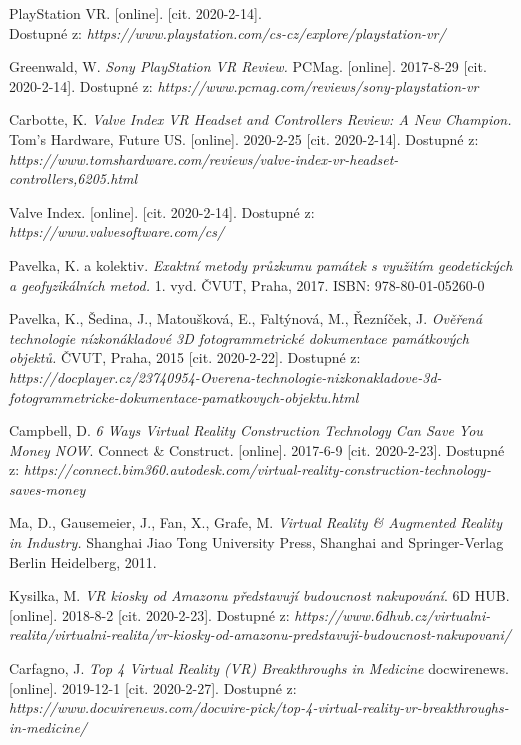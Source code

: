 \documentclass[a4paper, 12pt]{report}
\begin{document}
\begin{thebibliography}{9}
 PlayStation VR. [online]. [cit. 2020-2-14]. \\Dostupné z: \textit{https://www.playstation.com/cs-cz/explore/playstation-vr/}

 Greenwald, W. \textit{Sony PlayStation VR Review.} PCMag. [online]. 2017-8-29 [cit. 2020-2-14]. Dostupné z: \textit{https://www.pcmag.com/reviews/sony-playstation-vr}

  Carbotte, K. \textit{Valve Index VR Headset and Controllers Review: A New Champion.} Tom's Hardware, Future US. [online]. 2020-2-25 [cit. 2020-2-14]. Dostupné z: \textit{https://www.tomshardware.com/reviews/valve-index-vr-headset-controllers,6205.html}

 Valve Index. [online]. [cit. 2020-2-14]. Dostupné z: \textit{https://www.valvesoftware.com/cs/}

 Pavelka, K. a kolektiv. \textit{Exaktní metody průzkumu památek s využitím geodetických a geofyzikálních metod.} 1. vyd. ČVUT, Praha, 2017. ISBN: 978-80-01-05260-0

 Pavelka, K., Šedina, J., Matoušková, E., Faltýnová, M., Řezníček, J. \textit{Ověřená technologie nízkonákladové 3D fotogrammetrické dokumentace památkových objektů.} ČVUT, Praha, 2015 [cit. 2020-2-22]. Dostupné z: \textit{https://docplayer.cz/23740954-Overena-technologie-nizkonakladove-3d-fotogrammetricke-dokumentace-pamatkovych-objektu.html}

 Campbell, D. \textit{6 Ways Virtual Reality Construction Technology Can Save You Money NOW}. Connect \& Construct. [online]. 2017-6-9 [cit. 2020-2-23]. Dostupné z: \textit{https://connect.bim360.autodesk.com/virtual-reality-construction-technology-saves-money}

 Ma, D., Gausemeier, J., Fan, X., Grafe, M. \textit{Virtual Reality \& Augmented Reality in Industry.} Shanghai Jiao Tong University Press, Shanghai and Springer-Verlag Berlin Heidelberg, 2011.

 Kysilka, M. \textit{VR kiosky od Amazonu představují budoucnost nakupování}. 6D HUB. [online]. 2018-8-2 [cit. 2020-2-23]. Dostupné z: \textit{https://www.6dhub.cz/virtualni-realita/virtualni-realita/vr-kiosky-od-amazonu-predstavuji-budoucnost-nakupovani/}

 Carfagno, J. \textit{Top 4 Virtual Reality (VR) Breakthroughs in Medicine} docwirenews. [online]. 2019-12-1 [cit. 2020-2-27]. Dostupné z: \textit{https://www.docwirenews.com/docwire-pick/top-4-virtual-reality-vr-breakthroughs-in-medicine/}


\end{thebibliography}
\end{document}
